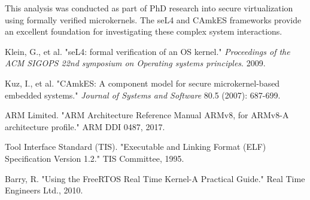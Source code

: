 \documentclass[11pt,a4paper]{article}
\begin{document}
This analysis was conducted as part of PhD research into secure virtualization using formally verified microkernels. The seL4 and CAmkES frameworks provide an excellent foundation for investigating these complex system interactions.


\begin{thebibliography}{99}

Klein, G., et al. "seL4: formal verification of an OS kernel." 
\textit{Proceedings of the ACM SIGOPS 22nd symposium on Operating systems principles}. 2009.

Kuz, I., et al. "CAmkES: A component model for secure microkernel-based embedded systems." 
\textit{Journal of Systems and Software} 80.5 (2007): 687-699.

ARM Limited. "ARM Architecture Reference Manual ARMv8, for ARMv8-A architecture profile." 
ARM DDI 0487, 2017.

Tool Interface Standard (TIS). "Executable and Linking Format (ELF) Specification Version 1.2." 
TIS Committee, 1995.

Barry, R. "Using the FreeRTOS Real Time Kernel-A Practical Guide." 
Real Time Engineers Ltd., 2010.

\end{thebibliography}
\end{document}
